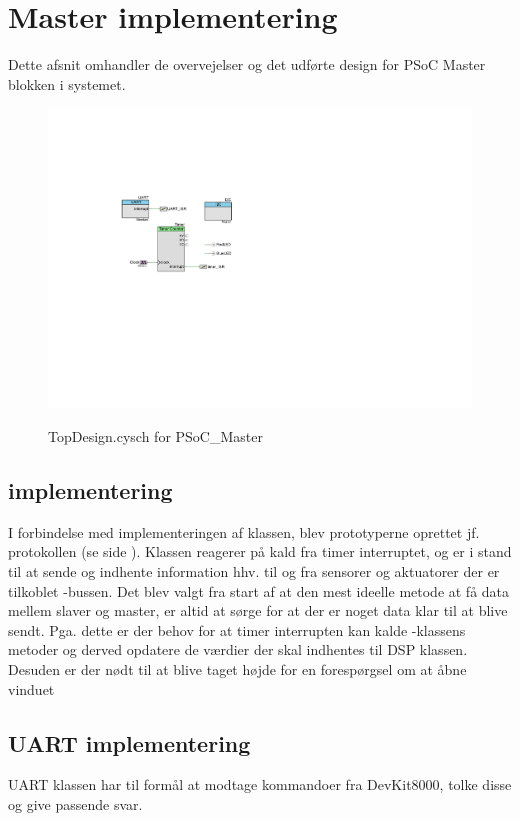 \section{Master implementering}

Dette afsnit omhandler de overvejelser og det udførte design for PSoC Master blokken i systemet.

\begin{figure}[h]
\centering
\includegraphics[width=\textwidth*3/5, trim=145 270 475 170, clip=true]{../fig/TopDesign_PSoC_Master}
\label{fig:psoc_master_topdesign}
\caption{TopDesign.cysch for PSoC\_Master}
\end{figure}

\subsection{\IIC implementering}

I forbindelse med implementeringen af \IIC klassen, blev prototyperne oprettet jf. \IIC protokollen (se side \pageref{sec:I2C_protokol}). Klassen reagerer på kald fra timer interruptet, og er i stand til at sende og indhente information hhv. til og fra sensorer og aktuatorer der er tilkoblet \IIC-bussen. Det blev valgt fra start af at den mest ideelle metode at få data mellem slaver og master, er altid at sørge for at der er noget data klar til at blive sendt. Pga. dette er der behov for at timer interrupten kan kalde \IIC-klassens metoder og derved opdatere de værdier der skal indhentes til DSP klassen. Desuden er der nødt til at blive taget højde for en forespørgsel om at åbne vinduet

\subsection{UART implementering}
UART klassen har til formål at modtage kommandoer fra DevKit8000, tolke disse og give passende svar. 

